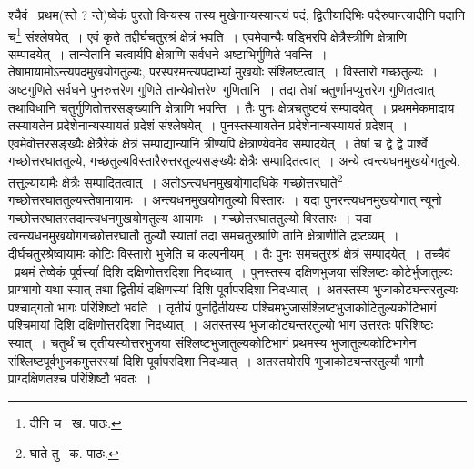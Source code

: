 \documentclass[11pt, openany]{book}
\begin{document}
\noindent श्चैवं \textendash\ प्रथम(स्ते ? न्ते)ष्वेकं पुरतो विन्यस्य तस्य मुखेनान्यस्यान्त्यं पदं, द्वितीयादिभिः पदैरुपान्त्यादीनि पदानि च\renewcommand{\thefootnote}{१}\footnote{दीनि च \textendash\ ख. पाठः.} संश्लेषयेत्~। एवं कृते तद्दीर्घचतुरश्रं क्षेत्रं भवति~। एवमेवान्यैः षड्भिरपि क्षेत्रैस्त्रीणि क्षेत्राणि सम्पादयेत्~। तान्येतानि चत्वार्यपि क्षेत्राणि सर्वधने अष्टाभिर्गुणिते भवन्ति~। तेषामायामोऽन्त्यपदमुखयोगतुल्यः, परस्परमन्त्यपदाभ्यां मुखयोः संश्लिष्टत्वात्~। विस्तारो गच्छतुल्यः~। अष्टगुणिते सर्वधने पुनरुत्तरेण गुणिते तान्येवोत्तरेण गुणितानि~। तदा तेषां चतुर्णामप्युत्तरेण गुणितत्वात् तथाविधानि चतुर्गुणितोत्तरसङ्ख्यानि क्षेत्राणि भवन्ति~। तैः पुनः क्षेत्रचतुष्टयं सम्पादयेत्~। प्रथममेकमादाय तस्यायतेन प्रदेशेनान्यस्यायतं प्रदेशं संश्लेषयेत्~। पुनस्तस्यायतेन प्रदेशेनान्यस्यायतं प्रदेशम्~। एवमेवोत्तरसङ्ख्यैः क्षेत्रैरेकं क्षेत्रं सम्पाद्यान्यानि त्रीण्यपि क्षेत्राण्येवमेव सम्पादयेत्~। तेषां च द्वे द्वे पार्श्वे गच्छोत्तरघाततुल्ये, गच्छतुल्यविस्तारैरुत्तरतुल्यसङ्ख्यैः क्षेत्रैः सम्पादितत्वात्~। अन्ये त्वन्त्यधनमुखयोगतुल्ये, तत्तुल्यायामैः क्षेत्रैः सम्पादितत्वात्~। अतोऽन्त्यधनमुखयोगादधिके गच्छोत्तरघाते\renewcommand{\thefootnote}{२}\footnote{घाते तु \textendash\ क. पाठः.} गच्छोत्तरघाततुल्यस्तेषामायामः~। अन्त्यधनमुखयोगतुल्यो विस्तारः~। यदा पुनरन्त्यधनमुखयोगात् न्यूनो गच्छोत्तरघातस्तदान्त्यधनमुखयोगतुल्य आयामः~। गच्छोत्तरघाततुल्यो विस्तारः~। यदा त्वन्त्यधनमुखयोगगच्छोत्तरघातौ तुल्यौ स्यातां तदा समचतुरश्राणि तानि क्षेत्राणीति द्रष्टव्यम्~। दीर्घचतुरश्रेष्वायामः कोटिः विस्तारो भुजेति च कल्पनीयम्~। तैः पुनः समचतुरश्रं क्षेत्रं सम्पादयेत्~। तच्चैवं \textendash\ प्रथमं तेष्वेकं पूर्वस्यांं दिशि दक्षिणोत्तरदिशा निदध्यात्~। पुनस्तस्य दक्षिणभुजया संश्लिष्टः कोटेर्भुजातुल्यः प्राग्भागो यथा स्यात् तथा द्वितीयं दक्षिणस्यां दिशि पूर्वापरदिशा निदध्यात्~। अतस्तस्य भुजाकोट्यन्तरतुल्यः पश्चाद्गतो भागः परिशिष्टो भवति~। तृतीयं पुनर्द्वितीयस्य
पश्चिमभुजासंश्लिष्टभुजाकोटितुल्यकोटिभागं पश्चिमायां दिशि दक्षिणोत्तरदिशा निदध्यात्~। अतस्तस्य भुजाकोट्यन्तरतुल्यो भाग उत्तरतः परिशिष्टः स्यात्~। चतुर्थं च तृतीयस्योत्तरभुजया संश्लिष्टभुजातुल्यकोटिभागं प्रथमस्य भुजातुल्यकोटिभागेन संश्लिष्टपूर्वभुजकमुत्तरस्यां दिशि पूर्वापरदिशा
निदध्यात्~। अतस्तयोरपि भुजाकोट्यन्तरतुल्यौ भागौ प्राग्दक्षिणतश्च परिशिष्टौ भवतः~।
\end{document}
